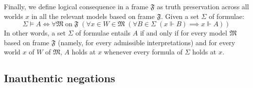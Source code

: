 Finally, we define logical consequence in a frame $\mathfrak{F}$ as truth preservation across all worlds $x$ in all the
relevant models based on frame $\mathfrak{F}$. Given a set $\Sigma$ of formulae:
\begin{equation*}
    \Sigma \vDash A \iff \forall \mathfrak{M} \;\textrm{on}\; \mathfrak{F} \;(\forall x \in W \in \mathfrak{M}\; (\forall B \in \Sigma\; (x \Vdash B) \implies x \Vdash A))
\end{equation*}
In other words, a set $\Sigma$ of formulae entails $A$ if and only if for every model $\mathfrak{M}$ based on frame $\mathfrak{F}$ (namely, for every admissible interpretations) and for every world $x$ of $W$ of $\mathfrak{M}$, $A$ holds at $x$ whenever every formula of $\Sigma$ holds at $x$.

\subsection{Inauthentic negations}

